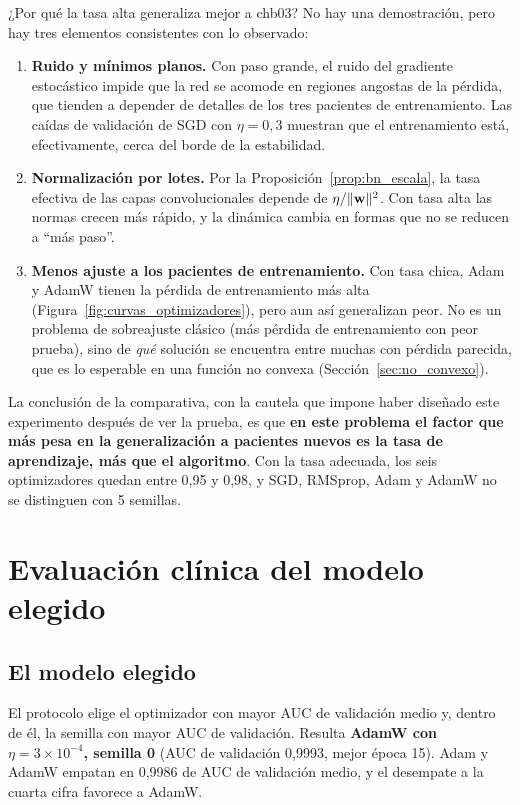 ¿Por qué la tasa alta generaliza mejor a chb03? No hay una demostración, pero hay tres elementos consistentes con lo
observado:
\begin{enumerate}
  \item \textbf{Ruido y mínimos planos.} Con paso grande, el ruido del gradiente estocástico impide que la red se acomode en
        regiones angostas de la pérdida, que tienden a depender de detalles de los tres pacientes de entrenamiento.
        Las caídas de validación de SGD con $\eta = 0{,}3$ muestran que el entrenamiento está, efectivamente, cerca del borde
        de la estabilidad.
  \item \textbf{Normalización por lotes.} Por la Proposición~\ref{prop:bn_escala}, la tasa efectiva de las capas convolucionales
        depende de $\eta/\lVert\mathbf{w}\rVert^2$. Con tasa alta las normas crecen más rápido, y la dinámica cambia en formas que no se
        reducen a ``más paso''.
  \item \textbf{Menos ajuste a los pacientes de entrenamiento.} Con tasa chica, Adam y AdamW tienen la pérdida de
        entrenamiento más alta (Figura~\ref{fig:curvas_optimizadores}), pero aun así generalizan peor. No es un problema de
        sobreajuste clásico (más pérdida de entrenamiento con peor prueba), sino de \emph{qué} solución se encuentra entre
        muchas con pérdida parecida, que es lo esperable en una función no convexa (Sección~\ref{sec:no_convexo}).
\end{enumerate}

La conclusión de la comparativa, con la cautela que impone haber diseñado este experimento después de ver la prueba, es que
\textbf{en este problema el factor que más pesa en la generalización a pacientes nuevos es la tasa de aprendizaje, más que el
algoritmo}. Con la tasa adecuada, los seis optimizadores quedan entre 0,95 y 0,98, y SGD, RMSprop, Adam y AdamW no se
distinguen con 5 semillas.

\section{Evaluación clínica del modelo elegido}
\label{sec:res_clinica}

\subsection{El modelo elegido}

El protocolo elige el optimizador con mayor AUC de validación medio y, dentro de él, la semilla con mayor AUC de validación.
Resulta \textbf{AdamW con $\eta = 3\times10^{-4}$, semilla 0} (AUC de validación 0,9993, mejor época 15). Adam y AdamW
empatan en 0,9986 de AUC de validación medio, y el desempate a la cuarta cifra favorece a AdamW.

